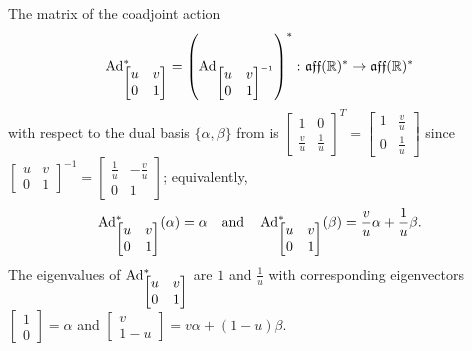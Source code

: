 \begin{example}
	The matrix of the coadjoint action 
	\[
		\operatorname{Ad}_{\begin{bmatrix} u & v \\ 0 & 1 \end{bmatrix}}^\ast = \left( \operatorname{Ad}_{\begin{bmatrix} u & v \\ 0 & 1 \end{bmatrix}^{-1}}\right)^\ast \colon\thinspace\! \mathfrak{aff}(\mathbb{R})^\ast \to \mathfrak{aff}(\mathbb{R})^\ast
	\]
	with respect to the dual basis $\{\alpha, \beta\}$ from  is $\begin{bmatrix} 1 & 0 \\ \frac{v}{u} & \frac{1}{u} \end{bmatrix}^T = \begin{bmatrix} 1 & \frac{v}{u} \\ 0 & \frac{1}{u} \end{bmatrix}$ since $\begin{bmatrix} u & v \\ 0 & 1 \end{bmatrix}^{-1} = \begin{bmatrix} \frac{1}{u} & -\frac{v}{u}\\ 0 & 1 \end{bmatrix}$; equivalently,
	\[
		\operatorname{Ad}_{\begin{bmatrix} u & v \\ 0 & 1 \end{bmatrix}}^\ast(\alpha) = \alpha \quad \text{and}\quad \operatorname{Ad}_{\begin{bmatrix} u & v \\ 0 & 1 \end{bmatrix}}^\ast(\beta) = \frac{v}{u} \alpha + \frac{1}{u} \beta.
	\]
	The eigenvalues of $\operatorname{Ad}_{\begin{bmatrix} u & v \\ 0 & 1 \end{bmatrix}}^\ast$ are $1$ and $\frac{1}{u}$ with corresponding eigenvectors $\begin{bmatrix}1 \\ 0 \end{bmatrix} = \alpha$ and $\begin{bmatrix}v \\ 1-u \end{bmatrix} = v \alpha + (1-u)\beta$.
\end{example}

